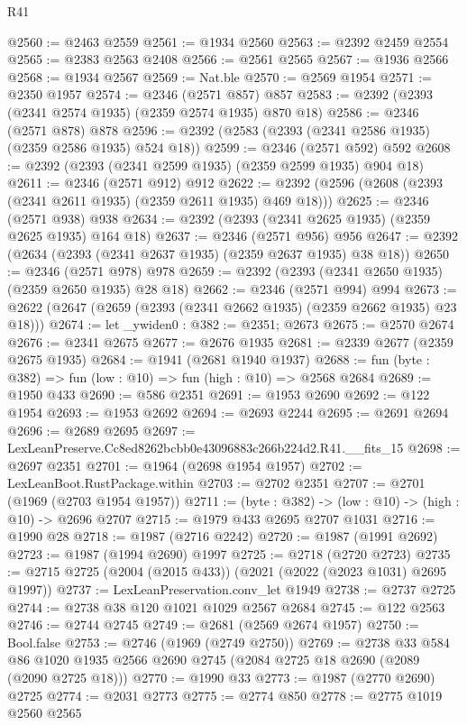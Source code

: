 \begin{lexlean}{R41}
\begin{coremodule}
@2560 := @2463 @2559
@2561 := @1934 @2560
@2563 := @2392 @2459 @2554
@2565 := @2383 @2563 @2408
@2566 := @2561 @2565
@2567 := @1936 @2566
@2568 := @1934 @2567
@2569 := Nat.ble
@2570 := @2569 @1954
@2571 := @2350 @1957
@2574 := @2346 (@2571 @857) @857
@2583 := @2392 (@2393 (@2341 @2574 @1935) (@2359 @2574 @1935) @870 @18)
@2586 := @2346 (@2571 @878) @878
@2596 := @2392 (@2583 (@2393 (@2341 @2586 @1935) (@2359 @2586 @1935) @524 @18))
@2599 := @2346 (@2571 @592) @592
@2608 := @2392 (@2393 (@2341 @2599 @1935) (@2359 @2599 @1935) @904 @18)
@2611 := @2346 (@2571 @912) @912
@2622 := @2392 (@2596 (@2608 (@2393 (@2341 @2611 @1935) (@2359 @2611 @1935) @469 @18)))
@2625 := @2346 (@2571 @938) @938
@2634 := @2392 (@2393 (@2341 @2625 @1935) (@2359 @2625 @1935) @164 @18)
@2637 := @2346 (@2571 @956) @956
@2647 := @2392 (@2634 (@2393 (@2341 @2637 @1935) (@2359 @2637 @1935) @38 @18))
@2650 := @2346 (@2571 @978) @978
@2659 := @2392 (@2393 (@2341 @2650 @1935) (@2359 @2650 @1935) @28 @18)
@2662 := @2346 (@2571 @994) @994
@2673 := @2622 (@2647 (@2659 (@2393 (@2341 @2662 @1935) (@2359 @2662 @1935) @23 @18)))
@2674 := let _ywiden0 : @382 := @2351; @2673
@2675 := @2570 @2674
@2676 := @2341 @2675
@2677 := @2676 @1935
@2681 := @2339 @2677 (@2359 @2675 @1935)
@2684 := @1941 (@2681 @1940 @1937)
@2688 := fun (byte : @382) => fun (low : @10) => fun (high : @10) => @2568 @2684
@2689 := @1950 @433
@2690 := @586 @2351
@2691 := @1953 @2690
@2692 := @122 @1954
@2693 := @1953 @2692
@2694 := @2693 @2244
@2695 := @2691 @2694
@2696 := @2689 @2695
@2697 := LexLeanPreserve.Cc8ed8262bcbb0e43096883c266b224d2.R41.__fits_15
@2698 := @2697 @2351
@2701 := @1964 (@2698 @1954 @1957)
@2702 := LexLeanBoot.RustPackage.within
@2703 := @2702 @2351
@2707 := @2701 (@1969 (@2703 @1954 @1957))
@2711 := (byte : @382) -> (low : @10) -> (high : @10) -> @2696 @2707
@2715 := @1979 @433 @2695 @2707 @1031
@2716 := @1990 @28
@2718 := @1987 (@2716 @2242)
@2720 := @1987 (@1991 @2692)
@2723 := @1987 (@1994 @2690) @1997
@2725 := @2718 (@2720 @2723)
@2735 := @2715 @2725 (@2004 (@2015 @433)) (@2021 (@2022 (@2023 @1031) @2695 @1997))
@2737 := LexLeanPreservation.conv_let @1949
@2738 := @2737 @2725
@2744 := @2738 @38 @120 @1021 @1029 @2567 @2684
@2745 := @122 @2563
@2746 := @2744 @2745
@2749 := @2681 (@2569 @2674 @1957)
@2750 := Bool.false
@2753 := @2746 (@1969 (@2749 @2750))
@2769 := @2738
    @33
    @584
    @86
    @1020
    @1935
    @2566
    @2690
    @2745
    (@2084 @2725 @18 @2690 (@2089 (@2090 @2725 @18)))
@2770 := @1990 @33
@2773 := @1987 (@2770 @2690) @2725
@2774 := @2031 @2773
@2775 := @2774 @850
@2778 := @2775 @1019 @2560 @2565

\end{coremodule}
\end{lexlean}
